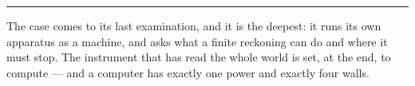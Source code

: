 %
%
%
%

\bigskip
\begin{center}
\rule{0.4\textwidth}{0.4pt}
\end{center}
\bigskip

\noindent The case comes to its last examination, and it is the deepest: it runs its own apparatus as a machine,
and asks what a finite reckoning can do and where it must stop. The instrument that has read the whole world is
set, at the end, to compute --- and a computer has exactly one power and exactly four walls.

